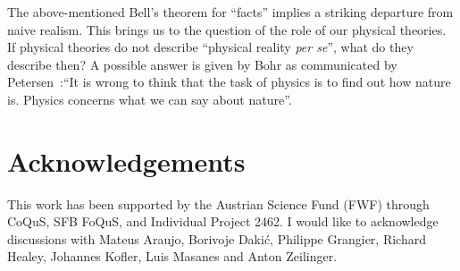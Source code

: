 \documentclass[12pt]{article}
\begin{document}
The above-mentioned Bell's theorem for ``facts'' implies a striking departure from naive realism. This brings us to the question of the role of our physical theories. If physical theories do not describe ``physical reality {\it per se}'', what do they describe then? A possible answer is given by Bohr as communicated by Petersen~\cite{bohr}:``It is wrong to think that the task of physics is to find out how nature is. Physics concerns what we can say about nature''.

\section{Acknowledgements}
This work has been supported by the Austrian Science Fund (FWF) through CoQuS, SFB FoQuS, and Individual Project 2462. I would like to acknowledge discussions with Mateus Araujo, Borivoje Daki{\'c}, Philippe Grangier, Richard Healey, Johannes Kofler, Luis Masanes and Anton Zeilinger.
\end{document}
